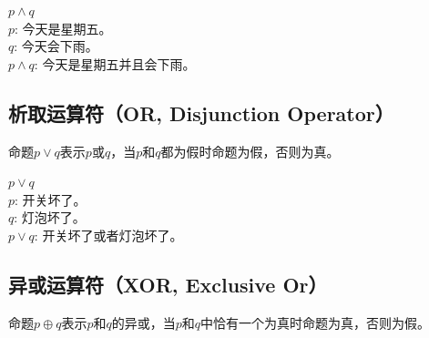 \documentclass[12pt, openany, oneside]{book}
\begin{document}
\begin{tcolorbox}
	$ p \wedge q $ \\
	$ p $: 今天是星期五。 \\
	$ q $: 今天会下雨。 \\
	$ p \wedge q $: 今天是星期五并且会下雨。
\end{tcolorbox}

\subsection{析取运算符（OR, Disjunction Operator）}

命题$ p \vee q $表示$ p $或$ q $，当$ p $和$ q $都为假时命题为假，否则为真。

\begin{table}[H]
	\centering
	\caption{OR真值表}
\end{table}

\begin{tcolorbox}
	$ p \vee q $ \\
	$ p $: 开关坏了。 \\
	$ q $: 灯泡坏了。 \\
	$ p \vee q $: 开关坏了或者灯泡坏了。
\end{tcolorbox}

\subsection{异或运算符（XOR, Exclusive Or）}

命题$ p \oplus q $表示$ p $和$ q $的异或，当$ p $和$ q $中恰有一个为真时命题为真，否则为假。
\end{document}
